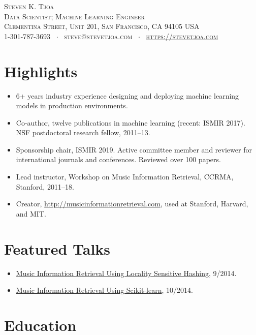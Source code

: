 \documentclass[10pt,letterpaper]{article}
\newcommand{\namestyle}{\huge \scshape}
\newcommand{\addressstyle}{\color{addresscolor} \footnotesize \rmfamily \upshape}
\begin{document}
\begin{center}
    \namestyle Steven K. Tjoa \\[0.2em]
    \addressstyle Data Scientist; Machine Learning Engineer \\
    \addressstyle 19 Clementina Street, Unit 201, San Francisco, CA 94105 USA \\
    1-301-787-3693 \ $\cdot$ \ steve@stevetjoa.com \ $\cdot$ \ \url{https://stevetjoa.com}
\end{center}


\small
\section*{Highlights}

\begin{itemize}
    \item 6+ years industry experience designing and deploying machine learning models in production environments.
    \item Co-author, twelve publications in machine learning (recent: ISMIR 2017). NSF postdoctoral research fellow, 2011--13. 
    \item Sponsorship chair, ISMIR 2019. Active committee member and reviewer for international journals and conferences. Reviewed over 100 papers.
    \item Lead instructor, Workshop on Music Information Retrieval, CCRMA, Stanford, 2011--18.
    \item Creator, \url{http://musicinformationretrieval.com}, used at Stanford, Harvard, and MIT.
\end{itemize}


\section*{Featured Talks}

\begin{itemize}
    \item \href{https://youtu.be/SghMq1xBJPI}{Music Information Retrieval Using Locality Sensitive Hashing}, 9/2014. 
    \item \href{https://youtu.be/oGGVvTgHMHw}{Music Information Retrieval Using Scikit-learn}, 10/2014. 
\end{itemize}

\section*{Education}
\end{document}
